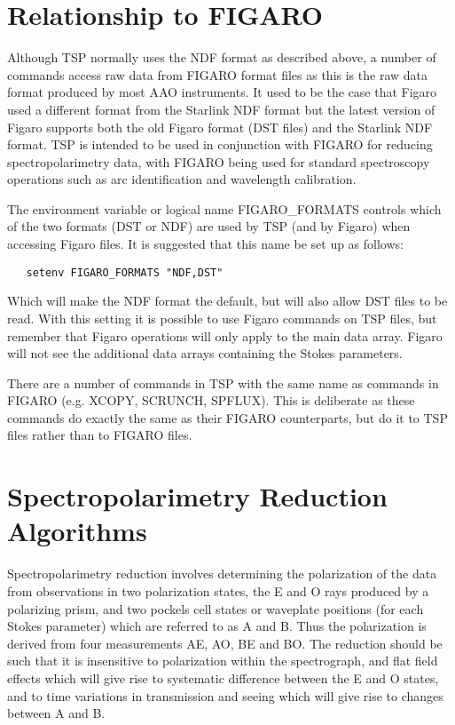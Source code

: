 \section{Relationship to FIGARO}

Although TSP normally uses the NDF format as described above, a
number of commands access raw data from FIGARO format files as this is the
raw data format produced by most AAO instruments. It used to be the case that
Figaro used a different format from the Starlink NDF format but the latest
version of Figaro supports both the old Figaro format (DST files) and the
Starlink NDF format. TSP is intended to be used in conjunction with FIGARO for
reducing spectropolarimetry data, with FIGARO being used for standard
spectroscopy operations such as arc identification and wavelength calibration.

The environment variable or logical name FIGARO\_FORMATS controls which of the two formats (DST or NDF)
are used by TSP (and by Figaro)  when accessing Figaro files. It is suggested
that this name be set up as follows:

\begin{verbatim}
   setenv FIGARO_FORMATS "NDF,DST"
\end{verbatim}


Which will make the NDF format the default, but will also allow DST files to
be read. With this setting it is possible to use Figaro commands on TSP files,
but remember that Figaro operations will only apply to the main data array.
Figaro will not see the additional data arrays containing the Stokes
parameters.

There are a number of commands in TSP with the same name as commands in
FIGARO (e.g. XCOPY, SCRUNCH, SPFLUX). This is deliberate as these commands
do exactly the same as their FIGARO counterparts, but do it to TSP files
rather than to FIGARO files.

\section{Spectropolarimetry Reduction Algorithms}

Spectropolarimetry reduction involves determining the polarization of the
data from observations in two polarization states, the E and O rays produced by
a polarizing prism, and two pockels cell states or waveplate positions
(for each Stokes parameter) which are referred to as A and B. Thus the
polarization is derived from four measurements AE, AO, BE and BO. The reduction
should be such that it is insensitive to polarization within the spectrograph,
and flat field effects which will give rise to systematic difference between
the E and O states, and to time variations in transmission and seeing which
will give rise to changes between A and B.

